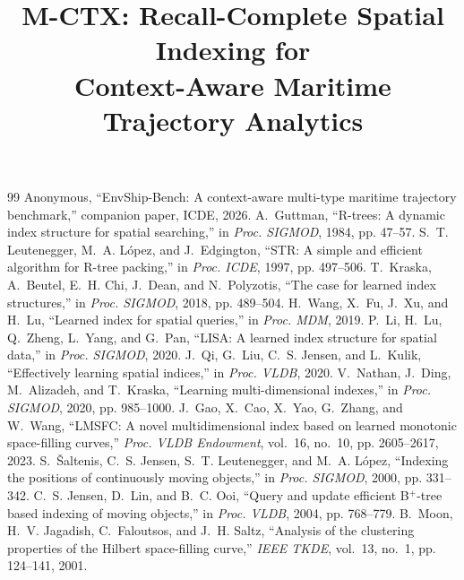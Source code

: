 \documentclass[conference]{IEEEtran}
\title{M-CTX: Recall-Complete Spatial Indexing for\\Context-Aware Maritime Trajectory Analytics}
\author{\IEEEauthorblockN{Anonymous}
\IEEEauthorblockA{Submitted to ICDE 2027}}
\begin{document}
\maketitle















\begin{thebibliography}{99}
 Anonymous, ``{EnvShip-Bench}: A context-aware multi-type maritime trajectory benchmark,'' companion paper, ICDE, 2026.
 A.~Guttman, ``{R}-trees: A dynamic index structure for spatial searching,'' in \emph{Proc. SIGMOD}, 1984, pp. 47--57.
 S.~T. Leutenegger, M.~A. L\'{o}pez, and J.~Edgington, ``{STR}: A simple and efficient algorithm for {R}-tree packing,'' in \emph{Proc. ICDE}, 1997, pp. 497--506.
 T.~Kraska, A.~Beutel, E.~H. Chi, J.~Dean, and N.~Polyzotis, ``The case for learned index structures,'' in \emph{Proc. SIGMOD}, 2018, pp. 489--504.
 H.~Wang, X.~Fu, J.~Xu, and H.~Lu, ``Learned index for spatial queries,'' in \emph{Proc. MDM}, 2019.
 P.~Li, H.~Lu, Q.~Zheng, L.~Yang, and G.~Pan, ``{LISA}: A learned index structure for spatial data,'' in \emph{Proc. SIGMOD}, 2020.
 J.~Qi, G.~Liu, C.~S. Jensen, and L.~Kulik, ``Effectively learning spatial indices,'' in \emph{Proc. VLDB}, 2020.
 V.~Nathan, J.~Ding, M.~Alizadeh, and T.~Kraska, ``Learning multi-dimensional indexes,'' in \emph{Proc. SIGMOD}, 2020, pp. 985--1000.
 J.~Gao, X.~Cao, X.~Yao, G.~Zhang, and W.~Wang, ``{LMSFC}: A novel multidimensional index based on learned monotonic space-filling curves,'' \emph{Proc. VLDB Endowment}, vol.~16, no.~10, pp. 2605--2617, 2023.
 S.~\v{S}altenis, C.~S. Jensen, S.~T. Leutenegger, and M.~A. L\'{o}pez, ``Indexing the positions of continuously moving objects,'' in \emph{Proc. SIGMOD}, 2000, pp. 331--342.
 C.~S. Jensen, D.~Lin, and B.~C. Ooi, ``Query and update efficient {B$^{+}$}-tree based indexing of moving objects,'' in \emph{Proc. VLDB}, 2004, pp. 768--779.
 B.~Moon, H.~V. Jagadish, C.~Faloutsos, and J.~H. Saltz, ``Analysis of the clustering properties of the {H}ilbert space-filling curve,'' \emph{IEEE TKDE}, vol.~13, no.~1, pp. 124--141, 2001.

\end{thebibliography}
\end{document}
